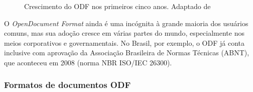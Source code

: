 \begin{figure}[ht]
    \centering
    \caption{Crescimento do ODF nos primeiros cinco anos. Adaptado de \cite{SILVA}}
    \label{crescimento_odf}
\end{figure}

\begin{citacao}
O \textit{OpenDocument Format} ainda é uma incógnita à grande maioria dos usuários comuns, mas sua adoção cresce em várias partes do mundo, especialmente nos meios corporativos e governamentais. No Brasil, por exemplo, o ODF já conta inclusive com aprovação da Associação Brasileira de Normas Técnicas (ABNT), que aconteceu em 2008 (norma NBR ISO/IEC 26300)\cite{ALECRIM-ODF}.
\end{citacao}

\subsubsection{Formatos de documentos ODF}

